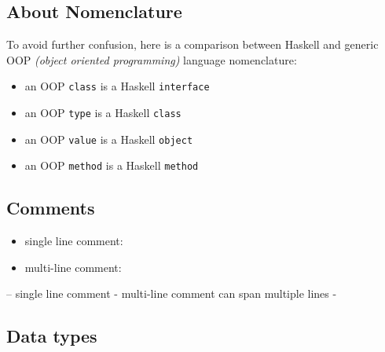 \documentclass[a4paper,landscape,10pt]{article}
\begin{document}
\begin{multicols*}{2}

  \subsection{About Nomenclature}

  To avoid further confusion, here is a comparison between Haskell and generic OOP \textit{(object oriented programming)} language nomenclature:

  \begin{itemize}
    \item an OOP \texttt{class} is a Haskell \texttt{interface}
    \item an OOP \texttt{type} is a Haskell \texttt{class}
    \item an OOP \texttt{value} is a Haskell \texttt{object}
    \item an OOP \texttt{method} is a Haskell \texttt{method}
  \end{itemize}

  \subsection{Comments}

  \begin{itemize}
    \item single line comment: \ihaskell{--}
    \item multi-line comment: 

  \end{itemize}

  \begin{haskell}
-- single line comment
{-
  multi-line comment
  can span
  multiple lines
-}
\end{haskell}

  \subsection{Data types}


\end{multicols*}
\end{document}
